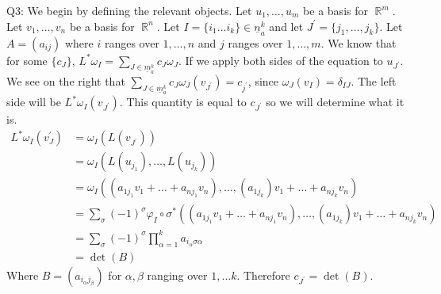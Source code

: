 \documentclass[letterpaper]{article}
\DeclareMathOperator{\R}{\mathbb{R}}
\begin{document}
\noindent Q3: We begin by defining the relevant objects. Let $u_1, \dots ,u_m$ be a basis for $\R^m$. Let $v_1,\dots ,v_n$ be a basis for $\R^n$. Let $I= \{ i_1\dots i_k \} \in \underline{n}_a^k$ and let $J^\prime = \{ j_1, \dots , j_k \}$. Let $A = (a_{ij})$ where $i$ ranges over $1,\dots ,n$ and $j$ ranges over $1,\dots , m$. We know that for some $\{c_J \}$, $L^{*}\omega_I = \sum_{J\in \underline{m}_a^k}c_J \omega_J$.
If we apply both sides of the equation to $u_{J^\prime}$. We see on the right that $\sum_{J\in \underline{m}_a^k} c_J \omega_J(v_{J^\prime}) = c_{j^\prime}$, since $\omega_J(v_I)=\delta_{IJ}$. 
The left side will be $L^{*}\omega_I(v_{J^\prime})$. This quantity is equal to $c_{J^\prime}$ so we will determine what it is. 
\begin{align*}
    L^{*}\omega_I(v_J^\prime) & = \omega_I(L(v_{J^\prime}))
    \\ & = \omega_I(L(u_{j_1}) , \dots , L(u_{j_k}))
    \\ & = \omega_I(({a_{1j_1}v_1 + \dots + a_{nj_1}v_n} ), \dots ,(a_{1j_k})v_1 + \dots + a_{nj_k}v_n )
    \\ & = \sum_{\sigma} (-1)^{\sigma} \varphi_{I}\circ \sigma^{*} (({a_{1j_1}v_1 + \dots + a_{nj_1}v_n} ), \dots ,(a_{1j_k})v_1 + \dots + a_{nj_k}v_n )
    \\ & = \sum_{\sigma} (-1)^{\sigma} \prod_{\alpha=1}^k a_{i_\alpha \sigma{\alpha}}
    \\ & = \det(B)
\end{align*} Where $B=(a_{i_\alpha j_\beta})$ for $\alpha,\beta $ ranging over $1,\dots k$. Therefore $c_{J^{\prime}} = \det(B)$.
\end{document}
